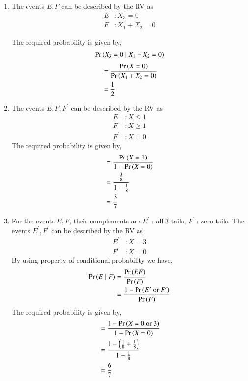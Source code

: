 \documentclass[journal,12pt,twocolumn]{IEEEtran}
\begin{document}
\begin{enumerate}
\begin{enumerate}
\item  The events $E, F$ can be described by the RV as
\begin{align}
E &: X_3 = 0\\
F &: X_1 + X_2 = 0 
\end{align}

The required probability is given by,
\begin{align}
\Pr\left(X_3 = 0 \mid X_1 + X_2 = 0\right)
\end{align}
\begin{align}
&= \frac{\Pr\left(X = 0\right)}{\Pr\left(X_1 + X_2 = 0\right)}\\
&= \frac{1}{2}
\end{align}

\item  The events $E, F, F^{\prime}$ can be described by the RV as
\begin{align}
E &: X \leq 1\\
F &: X \geq 1\\
F^{\prime} &: X = 0 
\end{align}
The required probability is given by,
\begin{align}
&= \frac{\Pr\left(X = 1\right)}{1 - \Pr\left(X = 0\right)}\\
&= \frac{\frac{3}{8}}{1-\frac{1}{8}}\\
&= \frac{3}{7}
\end{align}


\item  For the events $E, F$, their complements are
$E^{\prime}$ : all 3 tails, $F^{\prime}$ : zero tails. The events $E^{\prime}, F^{\prime}$ can be described by the RV as
\begin{align}
E^{\prime} &: X = 3\\
F^{\prime} &: X = 0 
\end{align}
By using property of conditional probability we have,
\begin{align}
\Pr\left(E \mid F\right) &= \frac{\Pr\left(EF\right)}{\Pr\left(F\right)} \label{eq:1}\\
&= \frac{1 - \Pr\left(E^{\prime} \text{ or }F^{\prime}\right)}{\Pr\left(F\right)}
\end{align}
The required probability is given by,
\begin{align}
&= \frac{1 - \Pr\left(X = 0 \text{ or }3\right)}{1 - \Pr\left(X = 0\right)}\\
&= \frac{1 - \left(\frac{1}{8} + \frac{1}{8}\right)}{1-\frac{1}{8}}\\
&= \frac{6}{7}
\end{align}

\end{enumerate}
\end{enumerate}
\end{document}
